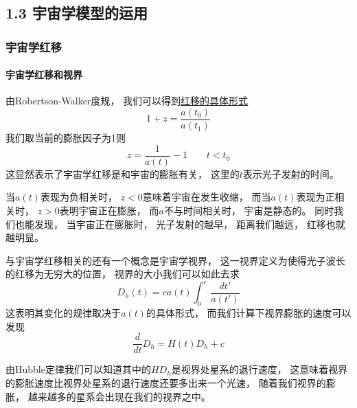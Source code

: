 \documentclass[8pt]{beamer}
\begin{document}
    \subsection{1.3 宇宙学模型的运用}
        \begin{frame}[fragile]
            \frametitle{宇宙学红移}
            \framesubtitle{宇宙学红移和视界}
            \begin{multicols}{2} 
                \qquad
                由Robertson-Walker度规，
                我们可以得到\hyperlink{附录}{\underline{红移的具体形式}}
                $$1+z=\frac{a(t_0)}{a(t_1)}$$
                我们取当前的膨胀因子为1则
                $$z=\frac{1}{a(t)}-1\qquad t<t_0$$
                这显然表示了宇宙学红移是和宇宙的膨胀有关，
                这里的$t$表示光子发射的时间。

                \qquad
                当$a(t)$表现为负相关时，
                $z<0$意味着宇宙在发生收缩，
                而当$a(t)$表现为正相关时，
                $z>0$表明宇宙正在膨胀，
                而$a$不与时间相关时，
                宇宙是静态的。
                同时我们也能发现，
                当宇宙正在膨胀时，
                光子发射的越早，
                距离我们越远，
                红移也就越明显。

                \qquad
                与宇宙学红移相关的还有一个概念是宇宙学视界，
                这一视界定义为使得光子波长的红移为无穷大的位置，
                视界的大小我们可以如此去求$$D_h(t)=ca(t)\int_0^r \,\frac{dt'}{a(t')}$$
                这表明其变化的规律取决于$a(t)$的具体形式，
                而我们计算下视界膨胀的速度可以发现
                $$\frac{d}{dt}D_h=H(t)D_h+c$$

                \qquad
                由Hubble定律我们可以知道其中的$HD_h$是视界处星系的退行速度，
                这意味着视界的膨胀速度比视界处星系的退行速度还要多出来一个光速，
                随着我们视界的膨胀，
                越来越多的星系会出现在我们的视界之中。
            \end{multicols}
        \end{frame}
\end{document}
